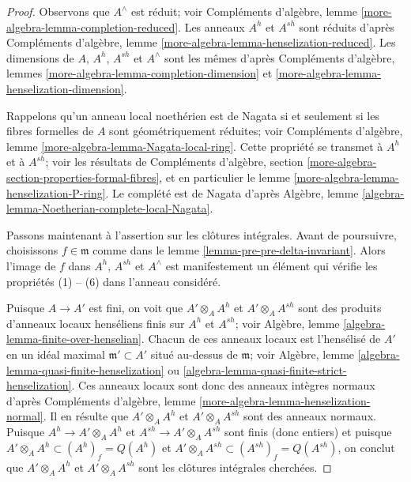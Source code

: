 \begin{proof}
Observons que $A^\wedge$ est réduit; voir
Compléments d'algèbre, lemme \ref{more-algebra-lemma-completion-reduced}.
Les anneaux $A^h$ et $A^{sh}$ sont réduits d'après
Compléments d'algèbre, lemme \ref{more-algebra-lemma-henselization-reduced}.
Les dimensions de $A$, $A^h$, $A^{sh}$ et $A^\wedge$ sont les mêmes
d'après Compléments d'algèbre, lemmes
\ref{more-algebra-lemma-completion-dimension} et
\ref{more-algebra-lemma-henselization-dimension}.

\medskip\noindent
Rappelons qu'un anneau local noethérien est de Nagata si et seulement si les
fibres formelles de $A$ sont géométriquement réduites; voir
Compléments d'algèbre, lemme \ref{more-algebra-lemma-Nagata-local-ring}.
Cette propriété se transmet à $A^h$ et à $A^{sh}$; voir
les résultats de Compléments d'algèbre, section
\ref{more-algebra-section-properties-formal-fibres},
et en particulier le lemme \ref{more-algebra-lemma-henselization-P-ring}.
Le complété est de Nagata d'après
Algèbre, lemme \ref{algebra-lemma-Noetherian-complete-local-Nagata}.

\medskip\noindent
Passons maintenant à l'assertion sur les clôtures intégrales. Avant de poursuivre,
choisissons $f \in \mathfrak m$ comme dans le
lemme \ref{lemma-pre-pre-delta-invariant}.
Alors l'image de $f$ dans $A^h$, $A^{sh}$ et $A^\wedge$
est manifestement un élément qui vérifie les propriétés (1) -- (6)
dans l'anneau considéré.

\medskip\noindent
Puisque $A \to A'$ est fini, on voit que
$A' \otimes_A A^h$ et $A' \otimes_A A^{sh}$
sont des produits d'anneaux locaux henséliens finis sur $A^h$ et
$A^{sh}$; voir Algèbre, lemme \ref{algebra-lemma-finite-over-henselian}.
Chacun de ces anneaux locaux est l'hensélisé de $A'$ en un
idéal maximal $\mathfrak m' \subset A'$ situé au-dessus de $\mathfrak m$; voir
Algèbre, lemme \ref{algebra-lemma-quasi-finite-henselization} ou
\ref{algebra-lemma-quasi-finite-strict-henselization}.
Ces anneaux locaux sont donc des anneaux intègres normaux d'après
Compléments d'algèbre, lemme \ref{more-algebra-lemma-henselization-normal}.
Il en résulte que $A' \otimes_A A^h$ et $A' \otimes_A A^{sh}$
sont des anneaux normaux. Puisque $A^h \to A' \otimes_A A^h$ et
$A^{sh} \to A' \otimes_A A^{sh}$ sont finis (donc entiers) et puisque
$A' \otimes_A A^h \subset (A^h)_f = Q(A^h)$ et
$A' \otimes_A A^{sh} \subset (A^{sh})_f = Q(A^{sh})$,
on conclut que $A' \otimes_A A^h$ et $A' \otimes_A A^{sh}$ sont
les clôtures intégrales cherchées.


\end{proof}
